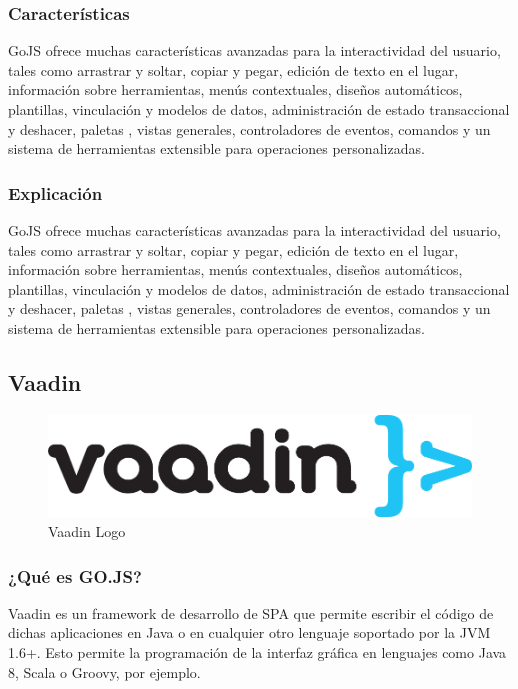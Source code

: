 \documentclass[a4paper,12pt]{article}
\begin{document}
	 		
	 		\subsubsection{Características}
	 		GoJS ofrece muchas características avanzadas para la interactividad del usuario, tales como arrastrar y soltar, copiar y pegar, edición de texto en el lugar, información sobre herramientas, menús contextuales, diseños automáticos, plantillas, vinculación y modelos de datos, administración de estado transaccional y deshacer, paletas , vistas generales, controladores de eventos, comandos y un sistema de herramientas extensible para operaciones personalizadas.
	 		
	 	
	 		\subsubsection{Explicación}
	 		GoJS ofrece muchas características avanzadas para la interactividad del usuario, tales como arrastrar y soltar, copiar y pegar, edición de texto en el lugar, información sobre herramientas, menús contextuales, diseños automáticos, plantillas, vinculación y modelos de datos, administración de estado transaccional y deshacer, paletas , vistas generales, controladores de eventos, comandos y un sistema de herramientas extensible para operaciones personalizadas.
	 
	 
	 	\subsection{Vaadin}
	 	
	 		\begin{figure}[h]
	 			\centering
	 			\includegraphics[scale=1]{Vaadin-logo.png}
	 			\caption{Vaadin Logo}\label{fig:Vaadin-logo}
	 		\end{figure}
 		
 			\subsubsection{¿Qué es GO.JS?}
 				Vaadin\cite{vaadin} es un framework de desarrollo de SPA que permite escribir el código de dichas aplicaciones en Java o en cualquier otro lenguaje soportado por la JVM 1.6+. Esto permite la programación de la interfaz gráfica en lenguajes como Java 8, Scala o Groovy, por ejemplo.
 			
\end{document}
